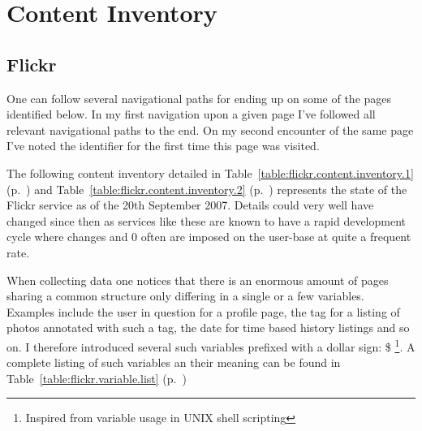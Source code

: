 \chapter{Content Inventory}

\label{appendix:content.inventory}

\section{Flickr}

One can follow several navigational paths for ending up on some of the pages
identified below. In my first navigation upon a given page I've followed all
relevant navigational paths to the end. On my second encounter of the same
page I've noted the identifier for the first time this page was visited.

The following content inventory detailed in
Table~\ref{table:flickr.content.inventory.1}
(p.~\pageref{table:flickr.content.inventory.1}) and
Table~\ref{table:flickr.content.inventory.2}
(p.~\pageref{table:flickr.content.inventory.2})
represents the state of the Flickr service as of the 20th September 2007.
Details could very well have changed since then as
services like these are known to have a rapid development cycle
where changes and 0 often are imposed on the user-base at quite
a frequent rate.

When collecting data one notices that there is an enormous amount of pages
sharing a common structure only differing in a single or a few variables.
Examples include
the user in question for a profile page, the tag for a listing of photos
annotated with such a tag, the date for time based history listings and so on.
I therefore introduced several such variables prefixed with a dollar sign: \$
\footnote{Inspired from variable usage in UNIX shell scripting}. A complete
listing of such variables an their meaning can be found in
Table~\ref{table:flickr.variable.list}
(p.~\pageref{table:flickr.variable.list})

